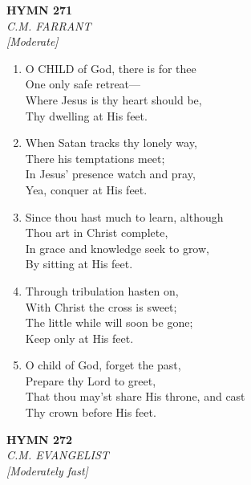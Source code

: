 \newpage
\begin{center}
    {\Large \textbf{HYMN 271}}
    \\
    \textit{C.M. FARRANT}
    \\
    \textit{\small [Moderate]}
\end{center}
\vspace{1em}

\begin{enumerate}
    \item O CHILD of God, there is for thee \\
        One only safe retreat--- \\
        Where Jesus is thy heart should be, \\
        Thy dwelling at His feet.

    \item When Satan tracks thy lonely way, \\
        There his temptations meet; \\
        In Jesus' presence watch and pray, \\
        Yea, conquer at His feet.

    \item Since thou hast much to learn, although \\
        Thou art in Christ complete, \\
        In grace and knowledge seek to grow, \\
        By sitting at His feet.

    \item Through tribulation hasten on, \\
        With Christ the cross is sweet; \\
        The little while will soon be gone; \\
        Keep only at His feet.

    \item O child of God, forget the past, \\
        Prepare thy Lord to greet, \\
        That thou may'st share His throne, and cast \\
        Thy crown before His feet.

\end{enumerate}

\newpage
\begin{center}
    {\Large \textbf{HYMN 272}}
    \\
    \textit{C.M. EVANGELIST}
    \\
    \textit{\small [Moderately fast]}
\end{center}
\vspace{1em}

